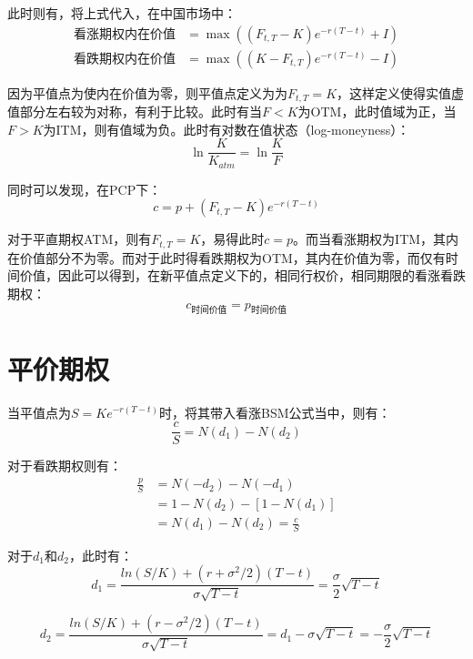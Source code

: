 \documentclass[11pt]{article}
\begin{document}
此时则有，将上式代入，在中国市场中：
\begin{align*}
    \text{看涨期权内在价值} & = \max((F_{t,T}-K)e^{-r(T-t)}+I) \\
    \text{看跌期权内在价值} & = \max((K-F_{t,T})e^{-r(T-t)}-I)
\end{align*}

因为平值点为使内在价值为零，则平值点定义为为$F_{t,T}=K$，这样定义使得实值虚值部分左右较为对称，有利于比较。此时有当$F<K$为OTM，此时值域为正，当$F>K$为ITM，则有值域为负。此时有对数在值状态（log-moneyness）：
\begin{equation*}
    \ln{\frac{K}{K_{atm}}} = \ln{\frac{K}{F}}
\end{equation*}

同时可以发现，在PCP下：
\begin{equation*}
    c = p + (F_{t,T}-K) e^{-r(T-t)}
\end{equation*}

对于平直期权ATM，则有$F_{t,T}=K$，易得此时$c=p$。而当看涨期权为ITM，其内在价值部分不为零。而对于此时得看跌期权为OTM，其内在价值为零，而仅有时间价值，因此可以得到，在新平值点定义下的，相同行权价，相同期限的看涨看跌期权：
\begin{equation*}
    c_{\text{时间价值}} = p_{\text{时间价值}}
\end{equation*}


\section{平价期权}

当平值点为$S = K e^{-r(T-t)}$时，将其带入看涨BSM公式当中，则有：
\begin{equation}
    \frac{c}{S} = N(d_1) - N(d_2)
\end{equation}

对于看跌期权则有：
\begin{align*}
    \frac{p}{S} & = N(-d_2) - N(-d_1) \\
    & = 1 - N(d_2) - [1-N(d_1)] \\
    & = N(d_1) - N(d_2) = \frac{c}{S}
\end{align*}

对于$d_1$和$d_2$，此时有：
\begin{equation}
    d_1 = \frac{ln(S/K)+(r+\sigma^2/2)(T-t)}{\sigma\sqrt{T-t}} = \frac{\sigma}{2}\sqrt{T-t}
\end{equation}

\begin{equation}
    d_2 = \frac{ln(S/K)+(r-\sigma^2/2)(T-t)}{\sigma\sqrt{T-t}} = d_1 - \sigma\sqrt{T-t}= -\frac{\sigma}{2}\sqrt{T-t}
\end{equation}
\end{document}
